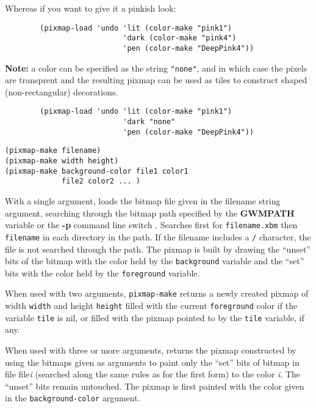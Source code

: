 Whereas if you want to give it a pinkish look:

{\exemplefont\begin{verbatim}
        (pixmap-load 'undo 'lit (color-make "pink1")
                           'dark (color-make "pink4")
                           'pen (color-make "DeepPink4"))
\end{verbatim}}

{\bf Note:} a color can be specified as the string \verb|"none"|, and in which
case the pixels are transprent and the resulting pixmap can be used as tiles
to construct shaped (non-rectangular) decorations.

{\exemplefont\begin{verbatim}
        (pixmap-load 'undo 'lit (color-make "pink1")
                           'dark "none"
                           'pen (color-make "DeepPink4"))
\end{verbatim}}


        
{\usagefont\begin{verbatim}
(pixmap-make filename)
(pixmap-make width height)
(pixmap-make background-color file1 color1 
             file2 color2 ... )
\end{verbatim}}\usageupspace

With a single argument, loads the bitmap file given in the filename string
argument, searching through the bitmap path specified by the {\bf GWMPATH}
variable or the {\bf -p} command line switch . 
Searches first for
\verb"filename.xbm" then \verb"filename" in each directory in the path. If
the filename includes a \verb"/" character, the file is not searched through
the path.
The pixmap is built by drawing the ``unset'' bits of the bitmap with the 
color held by the \verb"background" variable and  the ``set'' bits with
the color held by the \verb"foreground" variable.

When used with two arguments, \verb"pixmap-make" returns a newly
created pixmap of width \verb"width" and height \verb"height" filled with
the current \verb"foreground" color if the variable \verb"tile" is nil, or
filled with the pixmap pointed to by the \verb"tile" variable, if any.

When used with three or more arguments,
returns the pixmap constructed by using the bitmaps given as arguments to
paint only the ``set'' bits of bitmap in file file{\it i\/}
(searched along the same rules as for the first form) to the color{\it
i}.  The ``unset'' bits remain untouched. The pixmap is first painted with the
color given in the \verb"background-color" argument.

